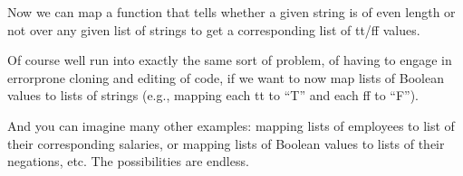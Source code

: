 \documentclass[letterpaper,10pt,english]{sphinxmanual}
\begin{document}
\begin{sphinxVerbatim}[commandchars=\\\{\}]
           
    
       

            
  
  
\end{sphinxVerbatim}

\sphinxAtStartPar
Now we can map a function that tells whether a given string
is of even length or not over any given list of strings to
get a corresponding list of tt/ff values.

\begin{sphinxVerbatim}[commandchars=\\\{\}]
     
   \PYG{o}{[}  \PYG{o}{]}
\end{sphinxVerbatim}

\sphinxAtStartPar
Of course well run into exactly the same sort of problem,
of having to engage in error\sphinxhyphen{}prone cloning and editing of
code, if we want to now map lists of Boolean values to lists
of strings (e.g., mapping each tt to “T” and each ff to “F”).

\sphinxAtStartPar
And you can imagine many other examples: mapping lists of
employees to list of their corresponding salaries, or mapping
lists of Boolean values to lists of their negations, etc. The
possibilities are endless.
\end{document}
